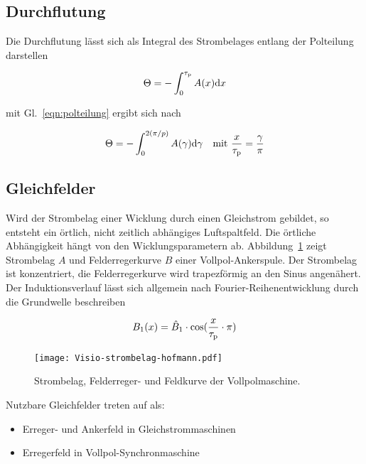 \subsection{Durchflutung}\label{sec:durchflutung}

Die Durchflutung lässt sich als Integral des Strombelages entlang der Polteilung darstellen

\begin{align}
\Theta = -\int_0^{\tau_{\mathrm{p}}} A(x)\mathrm{d}x
\end{align}

mit Gl.~\ref{eqn:polteilung} ergibt sich nach \textcite[S.~200]{hofmann2013}

\begin{align}
\Theta = - \int_0^{2(\pi /p)} A(\gamma)\mathrm{d}\gamma \quad \text{mit}\,\, \frac{x}{\tau_{\mathrm{p}}}=\frac{\gamma}{\pi}
\end{align}

\subsection{Gleichfelder}\label{sec:gleichfelder}

Wird der Strombelag einer Wicklung durch einen Gleichstrom gebildet, so entsteht ein örtlich, nicht zeitlich abhängiges Luftspaltfeld.
Die örtliche Abhängigkeit hängt von den Wicklungsparametern ab.
Abbildung~\ref{fig:Visio-strombelag-hofmann} zeigt Strombelag $A$ und Felderregerkurve $B$ einer Vollpol-Ankerspule.
Der Strombelag ist konzentriert, die Felderregerkurve wird trapezförmig an den Sinus angenähert.
Der Induktionsverlauf lässt sich allgemein nach Fourier-Reihenentwicklung durch die Grundwelle beschreiben

\begin{align}
B_{\mathrm{1}}(x) = \hat{B}_{\mathrm{1}}\cdot\cos(\frac{x}{\tau_{\mathrm{p}}}\cdot \pi)
\end{align}

\begin{figure}[h!]
\centering
\texttt{[image: Visio-strombelag-hofmann.pdf]}
\label{fig:Visio-strombelag-hofmann}
\caption{Strombelag, Felderreger- und Feldkurve der Vollpolmaschine.}
\end{figure}

Nutzbare Gleichfelder treten auf als:
\begin{itemize}
	\item Erreger- und Ankerfeld in Gleichstrommaschinen
	\item Erregerfeld in Vollpol-Synchronmaschine
\end{itemize}

